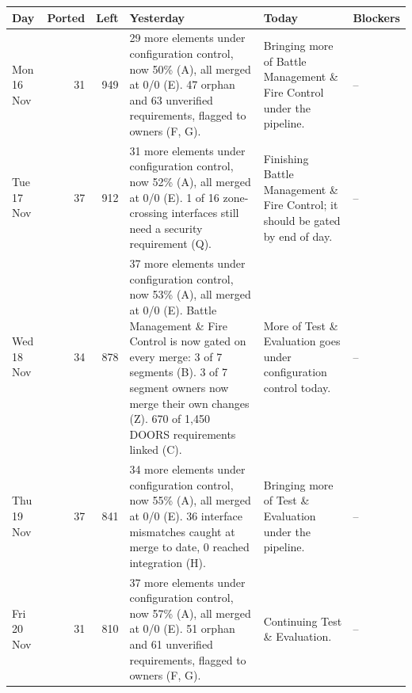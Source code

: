 \documentclass[12pt,letterpaper,oneside]{article}
\newcommand{\figfont}{\fontsize{9}{11}\selectfont}   %
\begin{document}
\begin{center}
\end{center}
{\figfont\setlength{\tabcolsep}{4pt}\renewcommand{\arraystretch}{1.15}
\begin{longtable}{@{}>{\raggedright}p{} r r >{\raggedright}p{} >{\raggedright}p{} >{\raggedright\arraybackslash}p{}@{}}
\toprule
Day & Ported & Left & Yesterday & Today & Blockers \\
\midrule
\endhead
\bottomrule
\endfoot
Mon 16 Nov & 31 & 949 & 29 more elements under configuration control, now 50\% (A), all merged at 0/0 (E). 47 orphan and 63 unverified requirements, flagged to owners (F, G). & Bringing more of Battle Management \& Fire Control under the pipeline. & -- \\
Tue 17 Nov & 37 & 912 & 31 more elements under configuration control, now 52\% (A), all merged at 0/0 (E). 1 of 16 zone-crossing interfaces still need a security requirement (Q). & Finishing Battle Management \& Fire Control; it should be gated by end of day. & -- \\
Wed 18 Nov & 34 & 878 & 37 more elements under configuration control, now 53\% (A), all merged at 0/0 (E). Battle Management \& Fire Control is now gated on every merge: 3 of 7 segments (B). 3 of 7 segment owners now merge their own changes (Z). 670 of 1,450 DOORS requirements linked (C). & More of Test \& Evaluation goes under configuration control today. & -- \\
Thu 19 Nov & 37 & 841 & 34 more elements under configuration control, now 55\% (A), all merged at 0/0 (E). 36 interface mismatches caught at merge to date, 0 reached integration (H). & Bringing more of Test \& Evaluation under the pipeline. & -- \\
Fri 20 Nov & 31 & 810 & 37 more elements under configuration control, now 57\% (A), all merged at 0/0 (E). 51 orphan and 61 unverified requirements, flagged to owners (F, G). & Continuing Test \& Evaluation. & -- \\

\end{longtable}}
\end{document}
